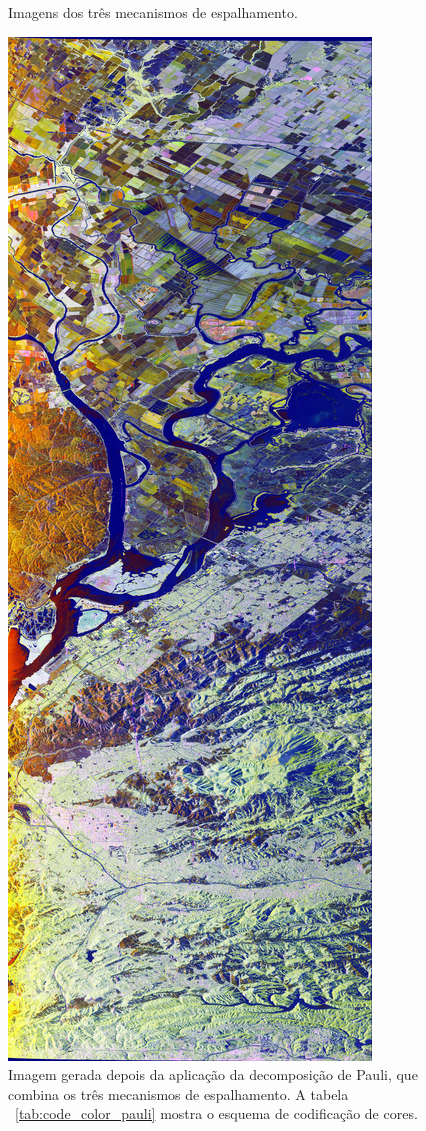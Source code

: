 \documentclass{article}
\begin{document}
\begin{figure}[h]
    \caption{Imagens dos três mecanismos de espalhamento.}
\end{figure}

\begin{figure}[H]
    \centering
    \includegraphics[width=.4\linewidth]{Images/Pauli.png}
    \caption{Imagem gerada depois da aplicação da decomposição de Pauli, que combina os três mecanismos de espalhamento. A tabela ~\ref{tab:code_color_pauli} mostra o esquema de codificação de cores.} 
    \label{fig:Pauli}
\end{figure}
\end{document}
